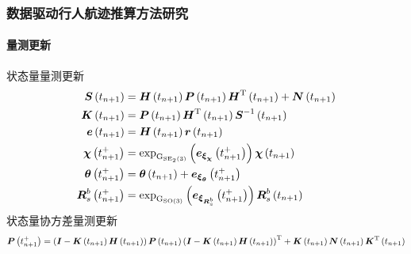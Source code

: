 \begin{frame}

	\frametitle{数据驱动行人航迹推算方法研究}	
	\framesubtitle{量测更新}
	\vspace{-0.2cm}
	{\small
		状态量量测更新
		\begin{align*}
	    	\vb*{S}\left(t_{n+1}\right) &= \vb*{H}\left(t_{n+1}\right) \vb*{P}\left(t_{n+1}\right) \vb*{H}^{\mathrm{T}}\left(t_{n+1}\right) + \vb*{N}\left(t_{n+1}\right) \\
	    	\vb*{K}\left(t_{n+1}\right) &= \vb*{P}\left(t_{n+1}\right) \vb*{H}^{\mathrm{T}}\left(t_{n+1}\right) \vb*{S}^{-1}\left(t_{n+1}\right) \\
		    \vb*{e}\left(t_{n+1}\right) &= \vb*{H}\left(t_{n+1}\right) \vb*{r}\left(t_{n+1}\right) \\
			\vb*{\chi}\left(t_{n+1}^+\right)   &= \exp_{\mathrm{G}_{\mathrm{SE}_2\left(3\right)}}\left( \vb*{e}_{\vb*{\xi}_{\vb*{\chi}}}\left(t_{n+1}^+\right) \right) \vb*{\chi}\left(t_{n+1}\right)\\
			\vb*{\theta}\left(t_{n+1}^+\right) &= \vb*{\theta}\left(t_{n+1}\right) + \vb*{e}_{\vb*{\xi}_{\vb*{\theta}}}\left(t_{n+1}^+\right) \\
			\vb*{R}_s^b\left(t_{n+1}^+\right)  &= \exp_{\mathrm{G}_{\mathrm{SO}\left(3\right)}}\left( \vb*{e}_{\vb*{\xi}_{\vb*{R}_s^b}}\left(t_{n+1}^+\right) \right) \vb*{R}_s^b\left(t_{n+1}\right)
		\end{align*}		
		状态量协方差量测更新
	}
	{\scriptsize
		\begin{equation*}
			\vb*{P}\left(t_{n+1}^+\right) = \left(\vb*{I} - \vb*{K}\left(t_{n+1}\right)\vb*{H}\left(t_{n+1}\right)\right) \vb*{P}\left(t_{n+1}\right) \left(\vb*{I} - \vb*{K}\left(t_{n+1}\right)\vb*{H}\left(t_{n+1}\right)\right)^{\mathrm{T}} + \vb*{K}\left(t_{n+1}\right)\vb*{N}\left(t_{n+1}\right) \vb*{K}^{\mathrm{T}}\left(t_{n+1}\right)
		\end{equation*}
	}
 
\end{frame}

